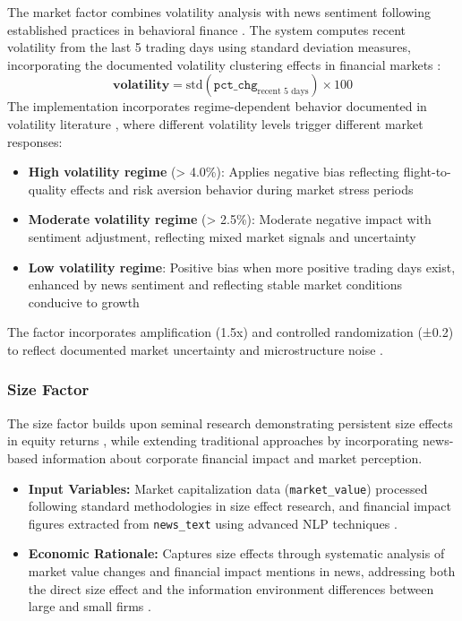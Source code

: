 \documentclass[3p,times,procedia]{elsarticle}
\begin{document}
The market factor combines volatility analysis with news sentiment following established practices in behavioral finance \cite{Daniel1998}. The system computes recent volatility from the last 5 trading days using standard deviation measures, incorporating the documented volatility clustering effects in financial markets \cite{Engle1982}:
\vspace{-0.5cm}
\begin{equation}
\textbf{volatility} = \text{std}(\texttt{pct\_chg}_{\text{recent 5 days}}) \times 100
\end{equation}
The implementation incorporates regime-dependent behavior documented in volatility literature \cite{Glosten1993}, where different volatility levels trigger different market responses:
\begin{itemize}
    \item \textbf{High volatility regime} (> 4.0\%): Applies negative bias reflecting flight-to-quality effects and risk aversion behavior during market stress periods
    
    \item \textbf{Moderate volatility regime} (> 2.5\%): Moderate negative impact with sentiment adjustment, reflecting mixed market signals and uncertainty  
    
    \item \textbf{Low volatility regime}: Positive bias when more positive trading days exist, enhanced by news sentiment and reflecting stable market conditions conducive to growth
\end{itemize}

The factor incorporates amplification (1.5x) and controlled randomization (±0.2) to reflect documented market uncertainty and microstructure noise \cite{Campbell2001}.

\subsubsection{{Size Factor}}

The size factor builds upon seminal research demonstrating persistent size effects in equity returns \cite{Banz1981}, while extending traditional approaches by incorporating news-based information about corporate financial impact and market perception.

\begin{itemize}
    \item \textbf{Input Variables:} Market capitalization data (\texttt{market\_value}) processed following standard methodologies in size effect research, and financial impact figures extracted from \texttt{news\_text} using advanced NLP techniques \cite{Loughran2011}.
    \item \textbf{Economic Rationale:} Captures size effects through systematic analysis of market value changes and financial impact mentions in news, addressing both the direct size effect and the information environment differences between large and small firms \cite{Banz1981}.
\end{itemize}
\end{document}
